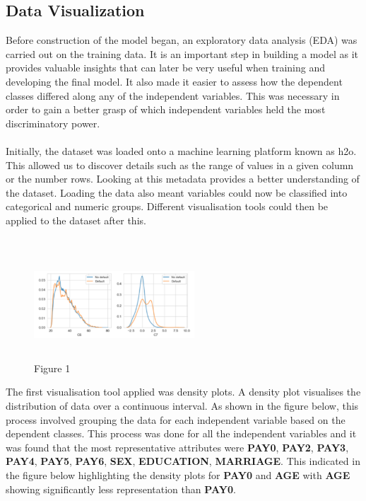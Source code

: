 \documentclass{article}
\begin{document}
\subsection{Data Visualization}
Before construction of the model began, an exploratory data analysis (EDA) was carried out on the training data. It is an important step in building a model as it provides valuable insights that can later be very useful when training and developing the final model. It also made it easier to assess how the dependent classes differed along any of the independent variables. This was necessary in order to gain a better grasp of which independent variables held the most discriminatory power. \\ \\
Initially, the dataset was loaded onto a machine learning platform known as h2o\cite{h2o}. This allowed us to discover details such as the range of values in a given column or the number rows. Looking at this metadata provides a better understanding of the dataset. Loading the data also meant variables could now be classified into categorical and numeric groups. Different visualisation tools could then be applied to the dataset after this.  \\ \\
\begin{figure}[h]
 \centering
 \includegraphics[width=6cm, height=4cm]{figure1.png}
 \caption{Figure 1}
 \label{fig:figure1}
\end{figure}
The first visualisation tool applied was density plots. A density plot visualises the distribution of data over a continuous interval. As shown in the figure below, this process involved grouping the data for each independent variable based on the dependent classes. This process was done for all the independent variables and it was    found that the most representative attributes were \textbf{PAY0}, \textbf{PAY2}, \textbf{PAY3}, \textbf{PAY4}, \textbf{PAY5}, \textbf{PAY6}, \textbf{SEX}, \textbf{EDUCATION}, \textbf{MARRIAGE}. This indicated in the figure below highlighting the density plots for \textbf{PAY0} and \textbf{AGE} with \textbf{AGE} showing significantly less representation than \textbf{PAY0}. \\ \\
\end{document}
